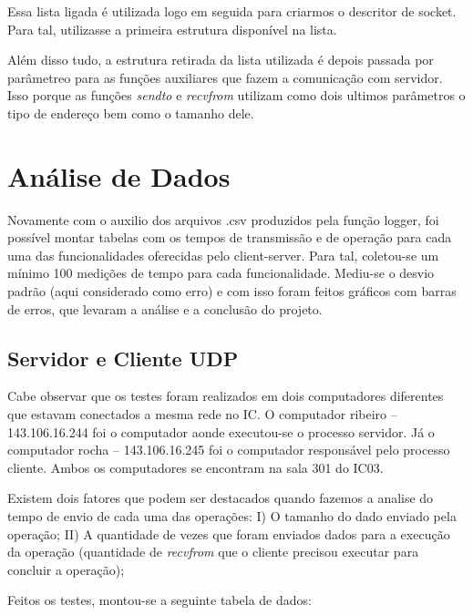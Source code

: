 \documentclass[10pt,a4paper]{report}
\begin{document}
	Essa lista ligada é utilizada logo em seguida para criarmos o descritor de socket. Para tal, utilizasse a primeira estrutura disponível na lista.
	
	Além disso tudo, a estrutura retirada da lista utilizada é depois passada por parâmetreo para as funções auxiliares que fazem a comunicação com servidor. Isso porque as funções \textit{sendto} e \textit{recvfrom} utilizam como dois ultimos parâmetros o tipo de endereço bem como o tamanho dele.

\chapter{Análise de Dados}
Novamente com o auxilio dos arquivos .csv produzidos pela função logger, foi possível montar tabelas com os tempos de transmissão e de operação para cada uma das funcionalidades oferecidas pelo client-server. Para tal, coletou-se um mínimo 100 medições de tempo para cada funcionalidade. Mediu-se o desvio padrão (aqui considerado como erro) e com isso foram feitos gráficos com barras de erros, que levaram a análise e a conclusão do projeto.
	
\section{Servidor e Cliente UDP}	
	Cabe observar que os testes foram realizados em dois computadores diferentes que estavam conectados a mesma rede no IC. O computador ribeiro – 143.106.16.244 foi o computador aonde executou-se o processo servidor. Já o computador rocha – 143.106.16.245 foi o computador responsável pelo processo cliente. Ambos os computadores se encontram na sala 301 do IC03.
	
	Existem dois fatores que podem ser destacados quando fazemos a analise do tempo de envio de cada uma das operações:
I) O tamanho do dado enviado pela operação;
II) A quantidade de vezes que foram enviados dados para a execução da operação (quantidade de \textit{recvfrom} que o cliente precisou executar para concluir a operação);
	
	Feitos os testes, montou-se a seguinte tabela de dados:
	\\
\end{document}
